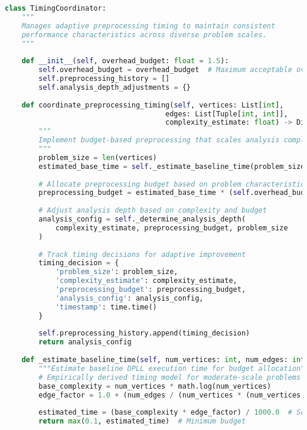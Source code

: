\begin{lstlisting}[language=Python, caption=Adaptive Timing Synchronisation for Consistent Overhead]
class TimingCoordinator:
    """
    Manages adaptive preprocessing timing to maintain consistent 
    performance characteristics across diverse problem scales.
    """
    
    def __init__(self, overhead_budget: float = 1.5):
        self.overhead_budget = overhead_budget  # Maximum acceptable overhead factor
        self.preprocessing_history = []
        self.analysis_depth_adjustments = {}
        
    def coordinate_preprocessing_timing(self, vertices: List[int], 
                                      edges: List[Tuple[int, int]],
                                      complexity_estimate: float) -> Dict[str, Any]:
        """
        Implement budget-based preprocessing that scales analysis complexity appropriately.
        """
        problem_size = len(vertices)
        estimated_base_time = self._estimate_baseline_time(problem_size, len(edges))
        
        # Allocate preprocessing budget based on problem characteristics
        preprocessing_budget = estimated_base_time * (self.overhead_budget - 1.0)
        
        # Adjust analysis depth based on complexity and budget
        analysis_config = self._determine_analysis_depth(
            complexity_estimate, preprocessing_budget, problem_size
        )
        
        # Track timing decisions for adaptive improvement
        timing_decision = {
            'problem_size': problem_size,
            'complexity_estimate': complexity_estimate,
            'preprocessing_budget': preprocessing_budget,
            'analysis_config': analysis_config,
            'timestamp': time.time()
        }
        
        self.preprocessing_history.append(timing_decision)
        return analysis_config
    
    def _estimate_baseline_time(self, num_vertices: int, num_edges: int) -> float:
        """Estimate baseline DPLL execution time for budget allocation"""
        # Empirically derived timing model for moderate-scale problems
        base_complexity = num_vertices * math.log(num_vertices)
        edge_factor = 1.0 + (num_edges / (num_vertices * (num_vertices - 1) / 2))
        
        estimated_time = (base_complexity * edge_factor) / 1000.0  # Scale to seconds
        return max(0.1, estimated_time)  # Minimum budget
    

\end{lstlisting}
